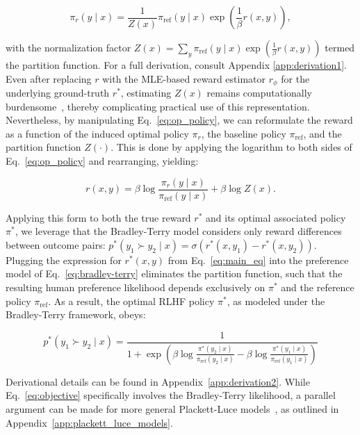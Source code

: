 \begin{equation}\label{eq:op_policy}
    \pi_r(y\mid x) = \frac{1}{Z(x)}\pi_\text{ref}(y\mid x)\exp\left(\frac{1}{\beta}r(x, y)\right),
\end{equation}

with the normalization factor $Z(x) =\sum_{y}\pi_\text{ref}(y\mid x)\exp\left(\frac{1}{\beta}r(x, y)\right)$ termed the partition function. For a full derivation, consult Appendix \ref{app:derivation1}. Even after replacing $r$ with the MLE-based reward estimator $r_{\phi}$ for the underlying ground-truth $r^*$, estimating $Z(x)$ remains computationally burdensome~\citep{korbak2022reinforcement, go2023aligning}, thereby complicating practical use of this representation. Nevertheless, by manipulating Eq.~\ref{eq:op_policy}, we can reformulate the reward as a function of the induced optimal policy $\pi_r$, the baseline policy $\pi_\text{ref}$, and the partition function $Z(\cdot)$. This is done by applying the logarithm to both sides of Eq.~\ref{eq:op_policy} and rearranging, yielding:

\begin{equation}\label{eq:main_eq}
    r(x,y) =\beta \log \frac{\pi_r(y\mid x)}{\pi_\text{ref}(y\mid x)} + \beta \log Z(x).
\end{equation}

Applying this form to both the true reward $r^*$ and its optimal associated policy $\pi^*$, we leverage that the Bradley-Terry model considers only reward differences between outcome pairs: ${p^*(y_1 \succ y_2 \mid x) = \sigma(r^*(x, y_1) - r^*(x, y_2))}$. Plugging the expression for $r^*(x,y)$ from Eq.~\ref{eq:main_eq} into the preference model of Eq.~\ref{eq:bradley-terry} eliminates the partition function, such that the resulting human preference likelihood depends exclusively on $\pi^*$ and the reference policy $\pi_\text{ref}$. As a result, the optimal RLHF policy $\pi^*$, as modeled under the Bradley-Terry framework, obeys:

\begin{equation}\label{eq:objective}
    p^*(y_1\succ y_2 \mid x)=\frac{1}{1 + \exp\left(\beta \log \frac{\pi^*(y_2\mid x)}{\pi_\text{ref}(y_2\mid x)} - \beta \log \frac{\pi^*(y_1\mid x)}{\pi_\text{ref}(y_1\mid x)}\right)}
\end{equation}

Derivational details can be found in Appendix~\ref{app:derivation2}. While Eq.~\ref{eq:objective} specifically involves the Bradley-Terry likelihood, a parallel argument can be made for more general Plackett-Luce models~\citep{plackett1975analysis, luce2012individual}, as outlined in Appendix~\ref{app:plackett_luce_models}.

